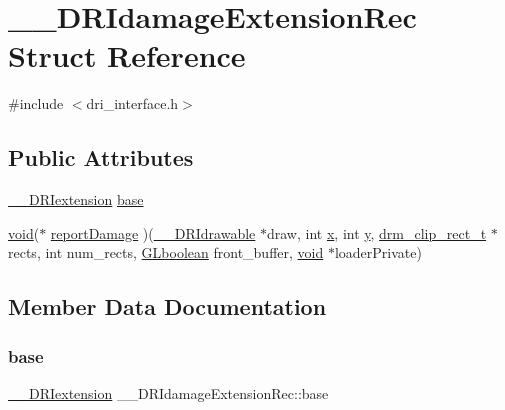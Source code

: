\hypertarget{struct_____d_r_idamage_extension_rec}{}\section{\+\_\+\+\_\+\+D\+R\+Idamage\+Extension\+Rec Struct Reference}
\label{struct_____d_r_idamage_extension_rec}


{\ttfamily \#include $<$dri\+\_\+interface.\+h$>$}

\subsection*{Public Attributes}
\begin{DoxyCompactItemize}
\item 
\hyperlink{dri__interface_8h_a4e0a61c8ece00d2b2c6792a9a1b55385}{\+\_\+\+\_\+\+D\+R\+Iextension} \hyperlink{struct_____d_r_idamage_extension_rec_a0c243c58e0f74a72a45e8397f78407fc}{base}
\item 
\hyperlink{_s_d_l__opengles2__gl2ext_8h_ae5d8fa23ad07c48bb609509eae494c95}{void}($\ast$ \hyperlink{struct_____d_r_idamage_extension_rec_af2bea08f719c79263f76d12ecddf24bc}{report\+Damage} )(\hyperlink{dri__interface_8h_a5bfb832a0a08208d95b3bbef439d2262}{\+\_\+\+\_\+\+D\+R\+Idrawable} $\ast$draw, int \hyperlink{gl_8h_ad0e63d0edcdbd3d79554076bf309fd47}{x}, int \hyperlink{gl_8h_a1675d9d7bb68e1657ff028643b4037e3}{y}, \hyperlink{dri__interface_8h_a912a372f2417e4f139f82bbf0a3d4fc1}{drm\+\_\+clip\+\_\+rect\+\_\+t} $\ast$rects, int num\+\_\+rects, \hyperlink{gl_8h_aea1419aa8aec5854bd9807b45171029d}{G\+Lboolean} front\+\_\+buffer, \hyperlink{_s_d_l__opengles2__gl2ext_8h_ae5d8fa23ad07c48bb609509eae494c95}{void} $\ast$loader\+Private)
\end{DoxyCompactItemize}


\subsection{Member Data Documentation}
\mbox{\label{struct_____d_r_idamage_extension_rec_a0c243c58e0f74a72a45e8397f78407fc}} 
\subsubsection{\texorpdfstring{base}{base}}
{\footnotesize\ttfamily \hyperlink{dri__interface_8h_a4e0a61c8ece00d2b2c6792a9a1b55385}{\+\_\+\+\_\+\+D\+R\+Iextension} \+\_\+\+\_\+\+D\+R\+Idamage\+Extension\+Rec\+::base}

